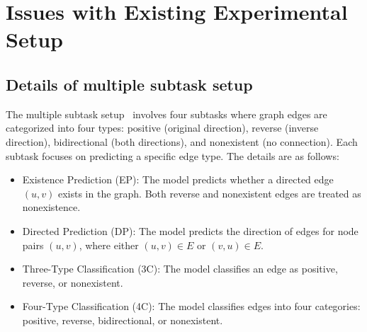 
\hypertarget{app_issues}{} 
\section{Issues with Existing Experimental Setup}\label{app_issues}

\hypertarget{app_issues_subtask}{} 
\subsection{Details of multiple subtask setup}\label{app_issues_subtask}
The multiple subtask setup~\cite{magnet,dpyg,duplex} involves four subtasks where graph edges are categorized into four types: positive (original direction), reverse (inverse direction), bidirectional (both directions), and nonexistent (no connection). Each subtask focuses on predicting a specific edge type. The details are as follows:
\begin{itemize}[topsep=0pt, partopsep=0pt]
    \item Existence Prediction (EP): The model predicts whether a directed edge $(u, v)$ exists in the graph. Both reverse and nonexistent edges are treated as nonexistence.
    \item Directed Prediction (DP): The model predicts the direction of edges for node pairs $(u, v)$, where either $(u, v) \in E$ or $(v, u) \in E$.
    \item Three-Type Classification (3C): The model classifies an edge as positive, reverse, or nonexistent.
    \item Four-Type Classification (4C): The model classifies edges into four categories: positive, reverse, bidirectional, or nonexistent.
\end{itemize}

